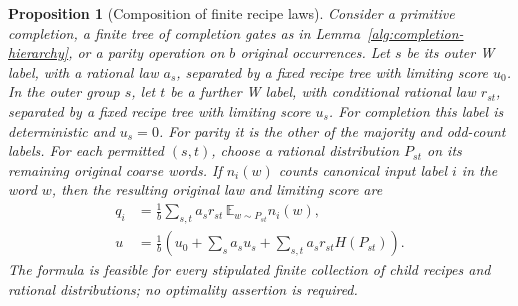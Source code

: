 \documentclass[11pt]{article}
\numberwithin{equation}{section}
\newtheorem{proposition}[theorem]{Proposition}
\theoremstyle{definition}
\theoremstyle{remark}
\begin{document}
\begin{proposition}[Composition of finite recipe laws]
\label{alg:recipe-composition}
Consider a primitive completion, a finite tree of completion gates as in
Lemma~\ref{alg:completion-hierarchy}, or a parity operation on \(b\)
original occurrences.
Let \(s\) be its outer W label, with a rational law \(a_s\), separated
by a fixed recipe tree with limiting score \(u_0\).  In the outer group \(s\),
let \(t\) be a further W label, with conditional rational law \(r_{st}\),
separated by a fixed recipe tree with limiting score \(u_s\).
For completion this label is deterministic and \(u_s=0\).
For parity it is the other of the majority and odd-count labels.
For each permitted \((s,t)\), choose a rational distribution \(P_{st}\)
on its remaining original coarse words.  If \(n_i(w)\) counts canonical
input label \(i\) in the word \(w\), then the resulting original law and
limiting score are
\begin{align}
 q_i&=\frac1b\sum_{s,t}a_s r_{st}\,
                   \mathbb E_{w\sim P_{st}}n_i(w),
       \label{alg:recipe-law}\\
 u&=\frac1b\left(u_0+\sum_s a_su_s
                     +\sum_{s,t}a_s r_{st}H(P_{st})\right).
       \label{alg:recipe-score}
\end{align}
The formula is feasible for every stipulated finite collection of child
recipes and rational distributions; no optimality assertion is required.
\end{proposition}
\end{document}
